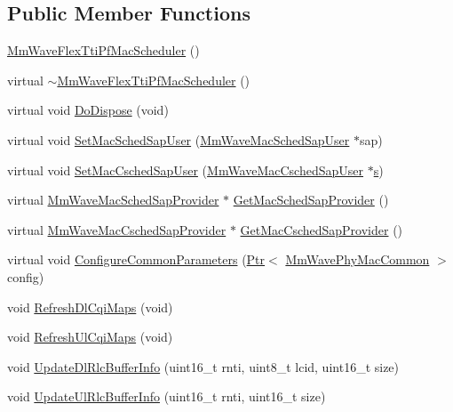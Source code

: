 \subsection*{Public Member Functions}
\begin{DoxyCompactItemize}
\item 
\hyperlink{classns3_1_1MmWaveFlexTtiPfMacScheduler_a8a7e9fe01cef16c0015050cca8d18805}{Mm\+Wave\+Flex\+Tti\+Pf\+Mac\+Scheduler} ()
\item 
virtual \hyperlink{classns3_1_1MmWaveFlexTtiPfMacScheduler_a1f7f1080ba9d3a249c0cfc4f695dc86e}{$\sim$\+Mm\+Wave\+Flex\+Tti\+Pf\+Mac\+Scheduler} ()
\item 
virtual void \hyperlink{classns3_1_1MmWaveFlexTtiPfMacScheduler_a2b7ea9d67388be61e549929380df537c}{Do\+Dispose} (void)
\item 
virtual void \hyperlink{classns3_1_1MmWaveFlexTtiPfMacScheduler_a43c16ccd58afa1f85921f4392a16c9b5}{Set\+Mac\+Sched\+Sap\+User} (\hyperlink{classns3_1_1MmWaveMacSchedSapUser}{Mm\+Wave\+Mac\+Sched\+Sap\+User} $\ast$sap)
\item 
virtual void \hyperlink{classns3_1_1MmWaveFlexTtiPfMacScheduler_a8786cc7033116113a50c9f57b70d4cf0}{Set\+Mac\+Csched\+Sap\+User} (\hyperlink{classns3_1_1MmWaveMacCschedSapUser}{Mm\+Wave\+Mac\+Csched\+Sap\+User} $\ast$\hyperlink{generate__test__data__lte__sinr_8m_ad83eeb3a142285d1243a08c6b7026df8}{s})
\item 
virtual \hyperlink{classns3_1_1MmWaveMacSchedSapProvider}{Mm\+Wave\+Mac\+Sched\+Sap\+Provider} $\ast$ \hyperlink{classns3_1_1MmWaveFlexTtiPfMacScheduler_a81bef5bc8349247e0f7e2d8dc2ec23fb}{Get\+Mac\+Sched\+Sap\+Provider} ()
\item 
virtual \hyperlink{classns3_1_1MmWaveMacCschedSapProvider}{Mm\+Wave\+Mac\+Csched\+Sap\+Provider} $\ast$ \hyperlink{classns3_1_1MmWaveFlexTtiPfMacScheduler_a853cce714236260c6ee818be730269c3}{Get\+Mac\+Csched\+Sap\+Provider} ()
\item 
virtual void \hyperlink{classns3_1_1MmWaveFlexTtiPfMacScheduler_affccdf17520fe40979af66aa65f8c508}{Configure\+Common\+Parameters} (\hyperlink{classns3_1_1Ptr}{Ptr}$<$ \hyperlink{classns3_1_1MmWavePhyMacCommon}{Mm\+Wave\+Phy\+Mac\+Common} $>$ config)
\item 
void \hyperlink{classns3_1_1MmWaveFlexTtiPfMacScheduler_a23d81177037898e2d2ba1840178ac647}{Refresh\+Dl\+Cqi\+Maps} (void)
\item 
void \hyperlink{classns3_1_1MmWaveFlexTtiPfMacScheduler_a3771e7640a49c7a6b4f8a84528e0fe85}{Refresh\+Ul\+Cqi\+Maps} (void)
\item 
void \hyperlink{classns3_1_1MmWaveFlexTtiPfMacScheduler_a7656880279e340e496567b69fdf3c0e9}{Update\+Dl\+Rlc\+Buffer\+Info} (uint16\+\_\+t rnti, uint8\+\_\+t lcid, uint16\+\_\+t size)
\item 
void \hyperlink{classns3_1_1MmWaveFlexTtiPfMacScheduler_acd27b41f4afbd2a76c6c1863ca9fc86f}{Update\+Ul\+Rlc\+Buffer\+Info} (uint16\+\_\+t rnti, uint16\+\_\+t size)
\end{DoxyCompactItemize}
